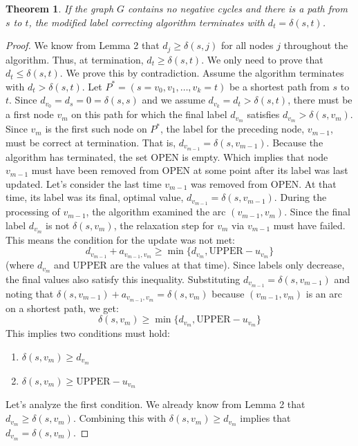 \documentclass[11pt, a4paper, oneside]{memoir}
\newtheorem{theorem}{Theorem}
\newcommand{\UPPER}{\text{UPPER}}
\newcommand{\OPEN}{\text{OPEN}}
\begin{document}
\begin{theorem}
  If the graph $G$ contains no negative cycles and there is a path from $s$ to $t$,
  the modified label correcting algorithm terminates with $d_t = \delta(s, t)$.
\end{theorem}
\begin{proof}
  We know from Lemma 2 that $d_j \ge \delta(s, j)$ for all nodes $j$ throughout the algorithm.
  Thus, at termination, $d_t \ge \delta(s, t)$. We only need to prove that $d_t \le \delta(s, t)$.
  We prove this by contradiction. Assume the algorithm terminates with $d_t > \delta(s, t)$.
  Let $P^* = (s=v_0, v_1, \dots, v_k=t)$ be a shortest path from $s$ to $t$.
  Since $d_{v_0} = d_s = 0 = \delta(s, s)$ and we assume $d_{v_k} = d_t > \delta(s, t)$,
  there must be a first node $v_m$ on this path for which the final label $d_{v_m}$ satisfies $d_{v_m} > \delta(s, v_m)$.
  Since $v_m$ is the first such node on $P^*$, the label for the preceding node, $v_{m-1}$,
  must be correct at termination. That is, $d_{v_{m-1}} = \delta(s, v_{m-1})$.
  Because the algorithm has terminated, the set $\OPEN$ is empty.
  Which implies that node $v_{m-1}$ must have been removed from $\OPEN$ at some point after its label was last updated.
  Let's consider the last time $v_{m-1}$ was removed from $\OPEN$.
  At that time, its label was its final, optimal value, $d_{v_{m-1}} = \delta(s, v_{m-1})$.
  During the processing of $v_{m-1}$, the algorithm examined the arc $(v_{m-1}, v_m)$.
  Since the final label $d_{v_m}$ is not $\delta(s, v_m)$, the relaxation step for $v_m$ via $v_{m-1}$ must have failed.
  This means the condition for the update was not met:
  \[ d_{v_{m-1}} + a_{v_{m-1}, v_m} \ge \min\{d_{v_m}, \UPPER - u_{v_m}\} \]
  (where $d_{v_m}$ and $\UPPER$ are the values at that time).
  Since labels only decrease, the final values also satisfy this inequality.
  Substituting $d_{v_{m-1}} = \delta(s, v_{m-1})$ and noting that $\delta(s, v_{m-1}) + a_{v_{m-1}, v_m} = \delta(s, v_m)$
  because $(v_{m-1}, v_m)$ is an arc on a shortest path, we get:
  \[ \delta(s, v_m) \ge \min\{d_{v_m}, \UPPER - u_{v_m}\} \]
  This implies two conditions must hold:
  \begin{enumerate}
    \item $\delta(s, v_m) \ge d_{v_m}$
    \item $\delta(s, v_m) \ge \UPPER - u_{v_m}$
  \end{enumerate}
  Let's analyze the first condition. We already know from Lemma 2 that $d_{v_m} \ge \delta(s, v_m)$.
  Combining this with $\delta(s, v_m) \ge d_{v_m}$ implies that $d_{v_m} = \delta(s, v_m)$.

\end{proof}
\end{document}
